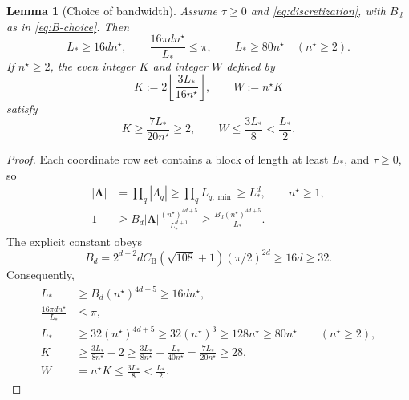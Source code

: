 \documentclass[11pt]{article}
\newtheorem{lemma}{Lemma}
\begin{document}
\begin{lemma}[Choice of bandwidth]\label{lem:selector-width}
Assume $\tau\ge0$ and \eqref{eq:discretization}, with $B_d$ as in \eqref{eq:B-choice}. Then
\begin{equation}\label{eq:threshold-feasible}
L_*\ge16dn^\star,\qquad \frac{16\pi dn^\star}{L_*}\le\pi,\qquad L_*\ge80n^\star\quad(n^\star\ge2).
\end{equation}
If $n^\star\ge2$, the even integer $K$ and integer $W$ defined by
\begin{equation}\label{eq:selector-width}
K:=2\left\lfloor\frac{3L_*}{16n^\star}\right\rfloor,\qquad W:=n^\star K
\end{equation}
satisfy
\begin{equation}\label{eq:width-bound}
K\ge\frac{7L_*}{20n^\star}\ge2,\qquad W\le\frac{3L_*}{8}<\frac{L_*}{2}.
\end{equation}
\end{lemma}
\begin{proof}
Each coordinate row set contains a block of length at least $L_*$, and $\tau\ge0$, so
\begin{align*}
|\bm\Lambda|&=\prod_q|\Lambda_q|\ge\prod_qL_{q,\min}\ge L_*^d,\qquad n^\star\ge1,\\
1&\ge B_d|\bm\Lambda|\frac{(n^\star)^{4d+5}}{L_*^{d+1}}\ge\frac{B_d(n^\star)^{4d+5}}{L_*}.
\end{align*}
The explicit constant obeys
\[
B_d=2^{d+2}dC_{\mathrm B}(\sqrt{108}+1)(\pi/2)^{2d}\ge16d\ge32.
\]
Consequently,
\begin{align*}
L_*&\ge B_d(n^\star)^{4d+5}\ge16dn^\star,\\
\frac{16\pi dn^\star}{L_*}&\le\pi,\\
L_*&\ge32(n^\star)^{4d+5}\ge32(n^\star)^3\ge128n^\star\ge80n^\star\qquad(n^\star\ge2),\\
K&\ge\frac{3L_*}{8n^\star}-2\ge\frac{3L_*}{8n^\star}-\frac{L_*}{40n^\star}=\frac{7L_*}{20n^\star}\ge28,\\
W&=n^\star K\le\frac{3L_*}{8}<\frac{L_*}{2}.
\end{align*}
\end{proof}
\end{document}
